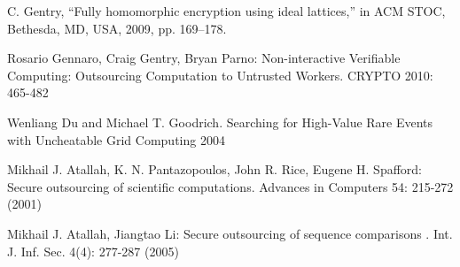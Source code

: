 \documentclass[runningheads,a4paper]{llncs}
\begin{document}
\begin{thebibliography}{4}
\bibitem{} C. Gentry, “Fully homomorphic encryption using ideal lattices,” in ACM STOC, Bethesda, MD, USA, 2009, pp. 169–178.

\bibitem{} Rosario Gennaro, Craig Gentry, Bryan Parno: Non-interactive Verifiable Computing: Outsourcing Computation to Untrusted Workers. CRYPTO 2010: 465-482

\bibitem{} Wenliang Du and Michael T. Goodrich. Searching for High-Value Rare Events with Uncheatable Grid Computing  2004

\bibitem{} Mikhail J. Atallah, K. N. Pantazopoulos, John R. Rice, Eugene H. Spafford: Secure outsourcing of scientific computations. Advances in Computers 54: 215-272 (2001)

\bibitem{} Mikhail J. Atallah, Jiangtao Li: Secure outsourcing of sequence comparisons . Int. J. Inf. Sec. 4(4): 277-287 (2005)

\end{thebibliography}
\end{document}
